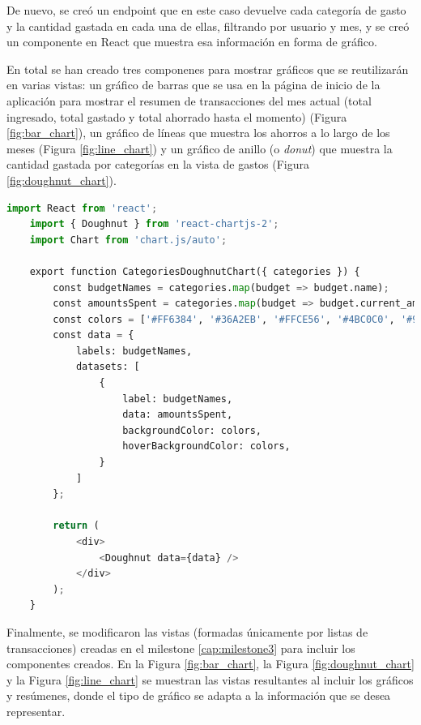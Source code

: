 De nuevo, se creó un endpoint que en este caso devuelve cada categoría de gasto y la cantidad gastada en cada una de ellas, filtrando por usuario y mes, y se creó un componente en React que muestra esa información en forma de gráfico.

En total se han creado tres componenes para mostrar gráficos que se reutilizarán en varias vistas: un gráfico de barras que se usa en la página de inicio de la aplicación para mostrar el resumen de transacciones del mes actual (total ingresado, total gastado y total ahorrado hasta el momento) (Figura \ref{fig:bar_chart}), un gráfico de líneas que muestra los ahorros a lo largo de los meses (Figura \ref{fig:line_chart}) y un gráfico de anillo (o \textit{donut}) que muestra la cantidad gastada por categorías en la vista de gastos (Figura \ref{fig:doughnut_chart}). 

\begin{lstlisting}[language=Python, caption=Componente de React para el gráfico de tipo donut]
    import React from 'react';
    import { Doughnut } from 'react-chartjs-2';
    import Chart from 'chart.js/auto';
    
    export function CategoriesDoughnutChart({ categories }) {
        const budgetNames = categories.map(budget => budget.name);
        const amountsSpent = categories.map(budget => budget.current_amount_spent);
        const colors = ['#FF6384', '#36A2EB', '#FFCE56', '#4BC0C0', '#9966FF', '#FF9F40'];
        const data = {
            labels: budgetNames,
            datasets: [
                {
                    label: budgetNames,
                    data: amountsSpent,
                    backgroundColor: colors,
                    hoverBackgroundColor: colors,
                }
            ]
        };
    
        return (
            <div>
                <Doughnut data={data} />
            </div>
        );
    }    
\end{lstlisting}



Finalmente, se modificaron las vistas (formadas únicamente por listas de transacciones) creadas en el milestone \ref{cap:milestone3} para incluir los componentes creados. En la Figura \ref{fig:bar_chart}, la Figura \ref{fig:doughnut_chart} y la Figura \ref{fig:line_chart} se muestran las vistas resultantes al incluir los gráficos y resúmenes, donde el tipo de gráfico se adapta a la información que se desea representar.

